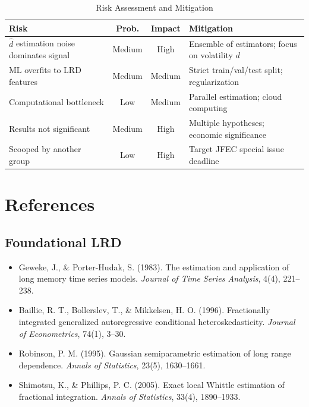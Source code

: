 \documentclass[11pt,a4paper]{article}
\theoremstyle{definition}
\newcommand{\dhat}{\hat{d}}
\begin{document}
\begin{table}[htbp]
\centering
\caption{Risk Assessment and Mitigation}
\begin{tabular}{@{}p{4cm}ccp{5cm}@{}}
\toprule
\textbf{Risk} & \textbf{Prob.} & \textbf{Impact} & \textbf{Mitigation} \\
\midrule
$\dhat$ estimation noise dominates signal & Medium & High & Ensemble of estimators; focus on volatility $d$ \\
ML overfits to LRD features & Medium & Medium & Strict train/val/test split; regularization \\
Computational bottleneck & Low & Medium & Parallel estimation; cloud computing \\
Results not significant & Medium & High & Multiple hypotheses; economic significance \\
Scooped by another group & Low & High & Target JFEC special issue deadline \\
\bottomrule
\end{tabular}
\end{table}

\newpage
\section{References}

\subsection*{Foundational LRD}

\begin{itemize}
    \item Geweke, J., \& Porter-Hudak, S. (1983). The estimation and application of long memory time series models. \textit{Journal of Time Series Analysis}, 4(4), 221--238.
    
    \item Baillie, R. T., Bollerslev, T., \& Mikkelsen, H. O. (1996). Fractionally integrated generalized autoregressive conditional heteroskedasticity. \textit{Journal of Econometrics}, 74(1), 3--30.
    
    \item Robinson, P. M. (1995). Gaussian semiparametric estimation of long range dependence. \textit{Annals of Statistics}, 23(5), 1630--1661.
    
    \item Shimotsu, K., \& Phillips, P. C. (2005). Exact local Whittle estimation of fractional integration. \textit{Annals of Statistics}, 33(4), 1890--1933.
\end{itemize}
\end{document}
